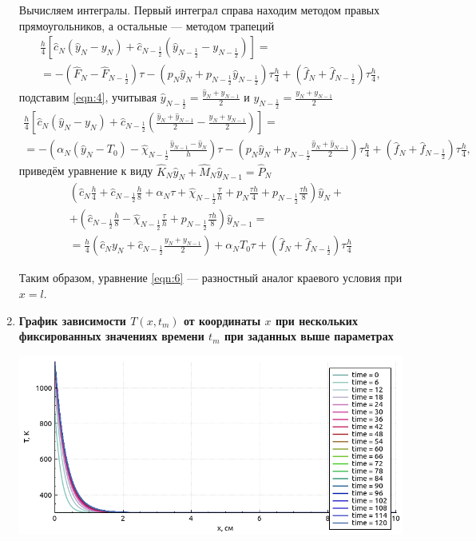 \documentclass[a4paper,oneside,12pt]{extreport}
\begin{document}
\begin{enumerate}
	Вычисляем интегралы.
	Первый интеграл справа находим методом правых прямоугольников, а остальные — методом трапеций
	\begin{multline*}
		\frac h4 \left[\widehat c_N\left(\widehat y_N - y_N\right) + \widehat c_{N-\frac12}\left(\widehat y_{N-\frac12} - y_{N-\frac12}\right)\right]
		=\\=
		-\left(\widehat F_N - \widehat F_{N-\frac12}\right)\tau
		-\left(p_N\widehat y_N + p_{N-\frac12}\widehat y_{N-\frac12}\right)\tau\frac h4
		+\left(\widehat f_N + \widehat f_{N-\frac12} \right)\tau\frac h4,
	\end{multline*}
	подставим \eqref{eqn:4}, учитывая $\displaystyle \widehat y_{N-\frac12}=\frac{\widehat y_N+\widehat y_{N-1}}2$ и $\displaystyle y_{N-\frac12}=\frac{y_N+y_{N-1}}2$
	\begin{multline*}
	\frac h4 \left[\widehat c_N\left(\widehat y_N - y_N\right) + \widehat c_{N-\frac12}\left(\frac{\widehat y_N+\widehat y_{N-1}}2 - \frac{y_N+y_{N-1}}2\right)\right]
	=\\=
	-\left(\alpha_N(\widehat y_N-T_0) - \widehat\chi_{N-\frac12}\frac{\widehat y_{N-1}-\widehat y_N}h\right)\tau
	-\left(p_N\widehat y_N + p_{N-\frac12}\frac{\widehat y_N+\widehat y_{N-1}}2\right)\tau\frac h4
	+\left(\widehat f_N + \widehat f_{N-\frac12} \right)\tau\frac h4,
	\end{multline*}
	приведём уравнение к виду $\widehat K_N\widehat y_N + \widehat M_N\widehat y_{N-1}=\widehat P_N$
	\begin{multline}
		\left(\widehat c_N\frac h4+\widehat c_{N-\frac12}\frac h8+\alpha_N\tau+\widehat\chi_{N-\frac12}\frac\tau h+p_N\frac{\tau h}4+p_{N-\frac12}\frac{\tau h}8\right)\widehat y_N
		+\\+\left(\widehat c_{N-\frac12}\frac h8-\widehat\chi_{N-\frac12}\frac\tau h+p_{N-\frac12}\frac{\tau h}8\right)\widehat y_{N-1}
		=\\=\frac h4\left(\widehat c_Ny_N+\widehat c_{N-\frac12}\frac{y_N+y_{N-1}}2\right) + \alpha_NT_0\tau
		+\left(\widehat f_N + \widehat f_{N-\frac12} \right)\tau\frac h4
		\label{eqn:6}
	\end{multline}

	Таким образом, уравнение \eqref{eqn:6} — разностный аналог краевого условия при $x=l$.


	\item \textbf{График зависимости $T(x, t_m)$ от координаты $x$ при нескольких фиксированных значениях времени $t_m$ при заданных выше параметрах}

	\includegraphics[width=\linewidth]{inc/img/graph1-1}


\end{enumerate}
\end{document}
